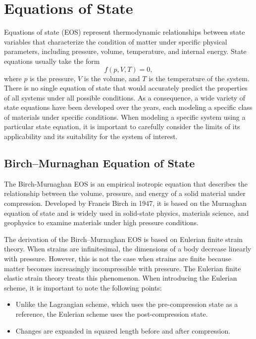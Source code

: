 \chapter{Equations of State}

Equations of state (EOS) represent thermodynamic relationships between state
variables that characterize the condition of matter under specific physical
parameters, including pressure, volume, temperature, and internal energy.
State equations usually take the form
\begin{equation}
  f(p, V, T) = 0,
\end{equation}
where $p$ is the pressure, $V$ is the volume, and $T$ is the temperature of
the system. There is no single equation of state that would accurately
predict the properties of all systems under all possible conditions. As a
consequence, a wide variety of state equations have been developed over the
years, each modeling a specific class of materials under specific conditions.
When modeling a specific system using a particular state equation, it is
important to carefully consider the limits of its applicability and its
suitability for the system of interest.

\section{Birch--Murnaghan Equation of State}

The Birch-Murnaghan EOS is an empirical isotropic equation that describes the
relationship between the volume, pressure, and energy of a solid material
under compression. Developed by Francis Birch in 1947, it is based on the
Murnaghan equation of state and is widely used in solid-state physics,
materials science, and geophysics to examine materials under high pressure
conditions.

The derivation of the Birch--Murnaghan EOS is based on Eulerian finite strain
theory. When strains are infinitesimal, the dimensions of a body decrease
linearly with pressure. However, this is not the case when strains are finite
because matter becomes increasingly incompressible with pressure. The Eulerian
finite elastic strain theory treats this phenomenon. When introducing the
Eulerian scheme, it is important to note the following points:
\begin{itemize}
  \item Unlike the Lagrangian scheme, which uses the pre-compression state as
  a reference, the Eulerian scheme uses the post-compression state.
  \item Changes are expanded in squared length before and after compression.
\end{itemize}

